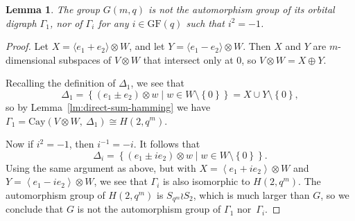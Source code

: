 \documentclass[10pt]{amsart}
\theoremstyle{definition}
\theoremstyle{plain}
\newtheorem{lemma}[lemma]{Lemma}
\theoremstyle{plain}
\theoremstyle{plain}
\theoremstyle{plain}
\newcommand{\Cay}{\mathrm{Cay}}
\newcommand{\GF}{\mathrm{GF}}
\begin{document}
\begin{lemma} \label{lm:Gamma_1,i}
The group $G{\left(m, q \right)}$ is not the automorphism group of its orbital digraph $\Gamma_1$, nor of $\Gamma_i$ for any $i \in \GF{\left(q \right)}$ such that $i^2 = -1$.
\end{lemma}
\begin{proof}
Let $X = \langle e_1 + e_2 \rangle \otimes W$, and let $Y = \langle e_1 - e_2 \rangle \otimes W$. Then $X$ and $Y$ are $m$-dimensional subspaces of $V \otimes W$ that intersect only at $0$, so $V \otimes W = X \oplus Y$.

Recalling the definition of $\Delta_1$, we see that
\begin{displaymath}
\Delta_1 = \left\{ \left(e_1 \pm e_2 \right) \otimes w \mid w \in W \setminus \left\{0 \right\} \right\} = X \cup Y \setminus {\left\{0 \right\}},
\end{displaymath}
so by Lemma~\ref{lm:direct-sum-hamming} we have $\Gamma_1 = \Cay{\left(V \otimes W,\ \Delta_1 \right)} \cong H{\left(2, q^m \right)}$.

Now if $i^2 = -1$, then $i^{-1} = -i$. It follows that
\begin{displaymath}
\Delta_i = {\left\{\left(e_1 \pm i e_2 \right) \otimes w \mid w \in W \setminus \left\{0 \right\}\right\}}.
\end{displaymath}
Using the same argument as above, but with $X = \left<e_1 + i e_2 \right> \otimes W$ and $Y = \left<e_1 - i e_2 \right> \otimes W$, we see that $\Gamma_i$ is also isomorphic to $H{\left(2, q^m \right)}$. The automorphism group of $H{\left(2, q^m \right)}$ is $S_{q^m} \wr S_2$, which is much larger than $G$, so we conclude that $G$ is not the automorphism group of $\Gamma_1$ nor~$\Gamma_i$.
\end{proof}
\end{document}
